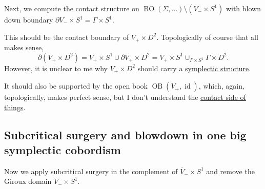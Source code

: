 Next, we compute the contact structure on $\operatorname{BO}(\Sigma, \dots) \setminus \left(V_- \times S^1\right)$
with blown down boundary $\partial V_- \times S^1 = \Gamma \times S^1$.

This should be the contact boundary of $V_+ \times D^2$.
Topologically of course that all makes sense,
\[
    \partial (V_+ \times D^2) = V_+ \times S^1 \cup \partial V_+ \times D^2 = V_+ \times S^1 \cup_{\Gamma \times S^1} \Gamma \times D^2.
\]
However, it is unclear to me why $V_+ \times D^2$ should carry a \underline{symplectic structure}.

It should also be supported by the open book $\operatorname{OB}(V_+, \operatorname{id})$,
which, again, topologically, makes perfect sense, but I don't understand the
\underline{contact side of things}.

\subsection*{Subcritical surgery and blowdown in one big symplectic cobordism}
Now we apply subcritical surgery in the complement of $\overline{V}_- \times S^1$ and
remove the Giroux domain $V_- \times S^1$.


